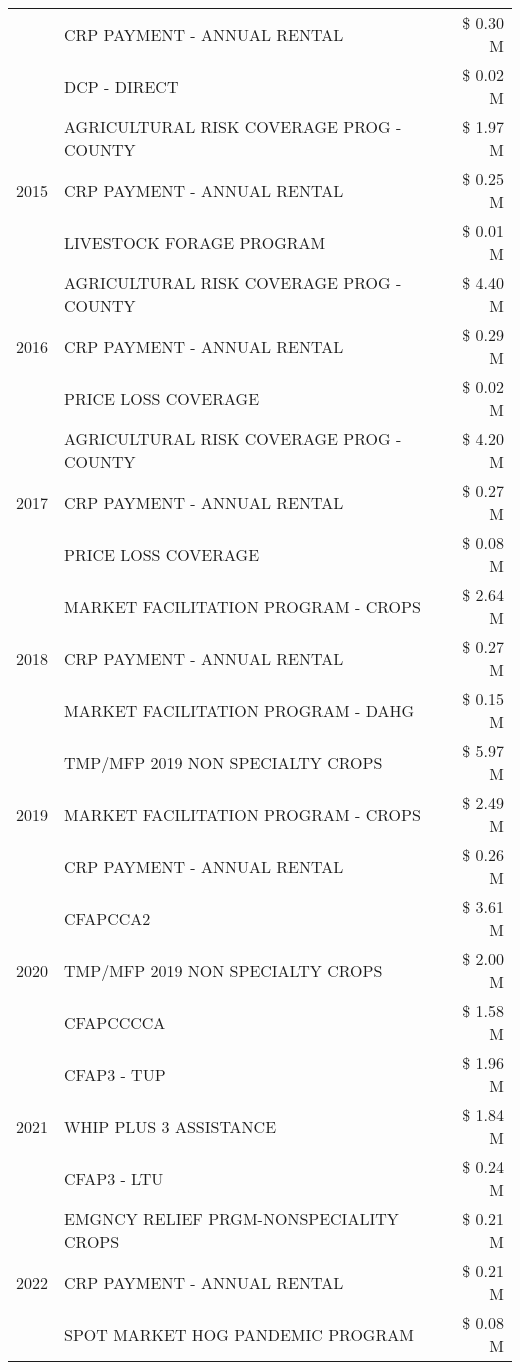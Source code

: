 \begin{tabular}{llr}
 & CRP PAYMENT - ANNUAL RENTAL & \$ 0.30 M \\
 & DCP - DIRECT & \$ 0.02 M \\
\cline{1-3}
\multirow[t]{3}{*}{2015} & AGRICULTURAL RISK COVERAGE PROG - COUNTY & \$ 1.97 M \\
 & CRP PAYMENT - ANNUAL RENTAL & \$ 0.25 M \\
 & LIVESTOCK FORAGE PROGRAM & \$ 0.01 M \\
\cline{1-3}
\multirow[t]{3}{*}{2016} & AGRICULTURAL RISK COVERAGE PROG - COUNTY & \$ 4.40 M \\
 & CRP PAYMENT - ANNUAL RENTAL & \$ 0.29 M \\
 & PRICE LOSS COVERAGE & \$ 0.02 M \\
\cline{1-3}
\multirow[t]{3}{*}{2017} & AGRICULTURAL RISK COVERAGE PROG - COUNTY & \$ 4.20 M \\
 & CRP PAYMENT - ANNUAL RENTAL & \$ 0.27 M \\
 & PRICE LOSS COVERAGE & \$ 0.08 M \\
\cline{1-3}
\multirow[t]{3}{*}{2018} & MARKET FACILITATION PROGRAM - CROPS & \$ 2.64 M \\
 & CRP PAYMENT - ANNUAL RENTAL & \$ 0.27 M \\
 & MARKET FACILITATION PROGRAM - DAHG & \$ 0.15 M \\
\cline{1-3}
\multirow[t]{3}{*}{2019} & TMP/MFP 2019 NON SPECIALTY CROPS & \$ 5.97 M \\
 & MARKET FACILITATION PROGRAM - CROPS & \$ 2.49 M \\
 & CRP PAYMENT - ANNUAL RENTAL & \$ 0.26 M \\
\cline{1-3}
\multirow[t]{3}{*}{2020} & CFAPCCA2 & \$ 3.61 M \\
 & TMP/MFP 2019 NON SPECIALTY CROPS & \$ 2.00 M \\
 & CFAPCCCCA & \$ 1.58 M \\
\cline{1-3}
\multirow[t]{3}{*}{2021} & CFAP3 - TUP & \$ 1.96 M \\
 & WHIP PLUS 3 ASSISTANCE & \$ 1.84 M \\
 & CFAP3 - LTU & \$ 0.24 M \\
\cline{1-3}
\multirow[t]{3}{*}{2022} & EMGNCY RELIEF PRGM-NONSPECIALITY CROPS & \$ 0.21 M \\
 & CRP PAYMENT - ANNUAL RENTAL & \$ 0.21 M \\
 & SPOT MARKET HOG PANDEMIC PROGRAM & \$ 0.08 M \\
\cline{1-3}
\bottomrule
\end{tabular}
